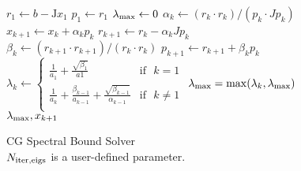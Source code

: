 \begin{figure}
  \begin{algorithm}[H]
    \caption{\label{alg:CG_Spectral_Bound_Solver}
      CG Spectral Bound Solver\\ $N_{\rm{iter,eigs}}$ is a user-defined parameter.
    }
    \begin{algorithmic}[1]
      \State $r_1 \leftarrow b - \mathrm{J}x_1$  
      \State $p_1 \leftarrow r_1$
      \State $\lambda_{\rm{max}} \leftarrow 0$
      \State $\alpha_k \leftarrow (r_{k} \cdot r_{k})/(p_k \cdot Jp_k)$
      \State $x_{k+1} \leftarrow x_{k} + \alpha_k p_k$
      \State $r_{k+1} \leftarrow r_{k} - \alpha_kJ p_k$
      \State $\beta_k \leftarrow (r_{k+1} \cdot r_{k+1})/(r_{k} \cdot r_{k})$ 
      \State $p_{k+1} \leftarrow r_{k+1} + \beta_kp_{k}$
      \State  $\lambda_k\leftarrow 
\begin{cases}
      \frac{1}{a_1} + \frac{\sqrt{\beta_1}}{a1} & \text{if} \,\,\,\, k = 1 \\[10pt]
    \frac{1}{a_{k}} + \frac{\beta_{k-1}}{a_{k-1}} + \frac{\sqrt{\beta_{k-1}}}{\alpha_{k-1}}  & \text{if} \,\,\,\, k \neq 1\\[10pt]
  \end{cases}
$\; 
\State  $\lambda_{\rm{max}} = \max(\lambda_k, \lambda_{\rm{max}})$
\EndFor\\
\Return $\lambda_{\rm{max}},x_{k + 1}$ 
  \EndFunction
    \end{algorithmic}
  \end{algorithm}
\end{figure}

